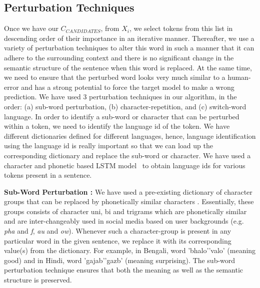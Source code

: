 \documentclass[sigconf]{acmart}
\begin{document}
\subsection{Perturbation Techniques}
Once we have our $C_{CANDIDATES}$, from $X_i$, we select tokens from this list in descending order of their importance in an iterative manner. Thereafter, we use a variety of perturbation techniques to alter this word in such a manner that it can adhere to the surrounding context and there is no significant change in the semantic structure of the sentence when this word is replaced. At the same time, we need to ensure that the perturbed word looks very much similar to a human-error and has a strong potential to force the target model to make a wrong prediction. 
We have used 3 perturbation techniques in our algorithm, in the order: (a) sub-word perturbation, (b) character-repetition, and (c) switch-word language. 
In order to identify a sub-word or character that can be perturbed within a token, we need to identify the language id of the token. We have different dictionaries defined for different languages, hence, language identification using the language id is really important so that we can load up the corresponding dictionary and replace the sub-word or character. We have used a character and phonetic based LSTM model~\cite{mandal2018language} to obtain language ids for various tokens present in a sentence.

\textbf{Sub-Word Perturbation :}
We have used a pre-existing dictionary of character groups that can be replaced by phonetically similar characters \cite{mandal2018language}. Essentially, these groups consists of character uni, bi and trigrams which are phonetically similar and are inter-changeably used in social media based on user backgrounds (e.g. \textit{pha} and \textit{f}, \textit{au} and \textit{ow}). Whenever such a character-group is present in any particular word in the given sentence, we replace it with its corresponding value(s) from the dictionary. For example, in Bengali, word 'bhalo'\textrightarrow'valo' (meaning good) and in Hindi, word 'gajab'\textrightarrow'gazb' (meaning surprising). 
The sub-word perturbation technique ensures that both the meaning as well as the semantic structure is preserved.
\end{document}
